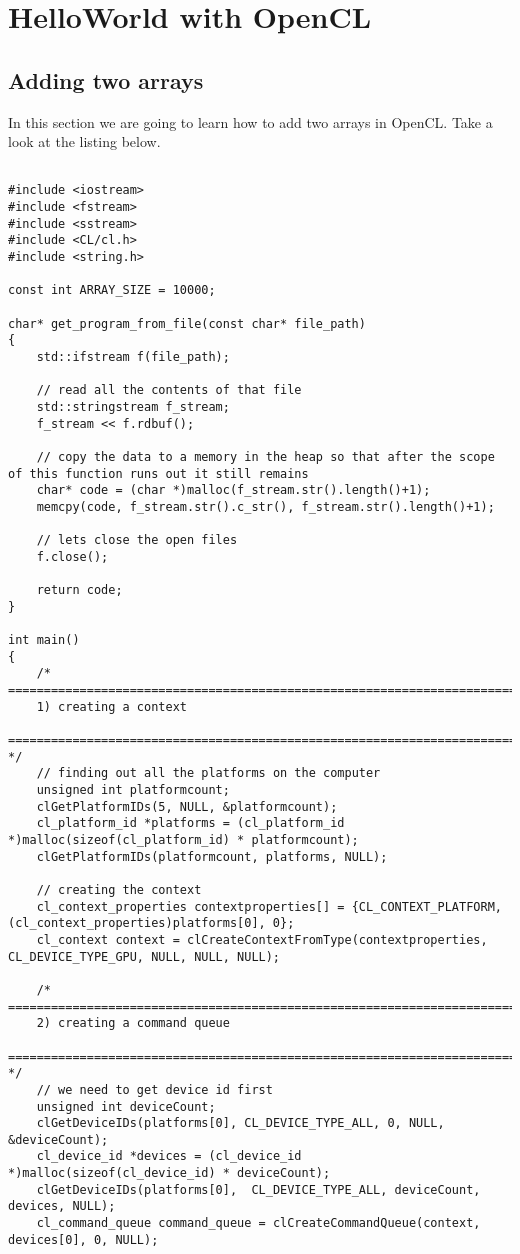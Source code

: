 {\color{red} \date{04-June-2020}}
\chapter{HelloWorld with OpenCL}
\section{Adding two arrays}
In this section we are going to learn how to add two arrays in OpenCL. Take a look at the listing below.

\begin{mdframed}[roundcorner=10pt, backgroundcolor=backgroundgray, outerlinewidth=2]
\begin{lstlisting}[frame=none]

#include <iostream>
#include <fstream>
#include <sstream>
#include <CL/cl.h>
#include <string.h>

const int ARRAY_SIZE = 10000;

char* get_program_from_file(const char* file_path)
{
	std::ifstream f(file_path);

	// read all the contents of that file
	std::stringstream f_stream;
	f_stream << f.rdbuf();

	// copy the data to a memory in the heap so that after the scope of this function runs out it still remains
	char* code = (char *)malloc(f_stream.str().length()+1);
	memcpy(code, f_stream.str().c_str(), f_stream.str().length()+1);

	// lets close the open files
	f.close();

	return code;
}

int main()
{
	/* =======================================================================================================
	1) creating a context
	======================================================================================================= */
	// finding out all the platforms on the computer
	unsigned int platformcount;
	clGetPlatformIDs(5, NULL, &platformcount);
	cl_platform_id *platforms = (cl_platform_id *)malloc(sizeof(cl_platform_id) * platformcount);
	clGetPlatformIDs(platformcount, platforms, NULL);

	// creating the context
	cl_context_properties contextproperties[] = {CL_CONTEXT_PLATFORM, (cl_context_properties)platforms[0], 0};
	cl_context context = clCreateContextFromType(contextproperties, CL_DEVICE_TYPE_GPU, NULL, NULL, NULL);

	/* =======================================================================================================
	2) creating a command queue
	======================================================================================================= */
	// we need to get device id first
	unsigned int deviceCount;
	clGetDeviceIDs(platforms[0], CL_DEVICE_TYPE_ALL, 0, NULL, &deviceCount);
	cl_device_id *devices = (cl_device_id *)malloc(sizeof(cl_device_id) * deviceCount);
	clGetDeviceIDs(platforms[0],  CL_DEVICE_TYPE_ALL, deviceCount, devices, NULL);
	cl_command_queue command_queue = clCreateCommandQueue(context, devices[0], 0, NULL);


\end{lstlisting}
\end{mdframed}
